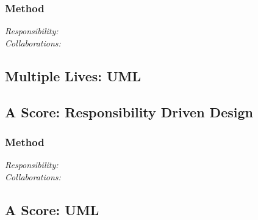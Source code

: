 \subsubsection{Method}
\textit{Responsibility:} \\
\textit{Collaborations:}

\subsection{Multiple Lives: UML}

\subsection{A Score: Responsibility Driven Design}


\subsubsection{Method}
\textit{Responsibility:} \\
\textit{Collaborations:}

\subsection{A Score: UML}
